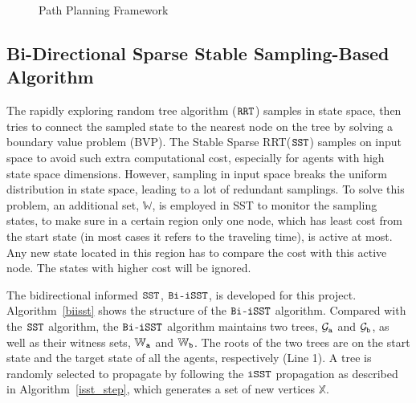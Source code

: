 \documentclass[conference, onecolumn]{IEEEtran}
\begin{document}
\begin{figure}[h]
	\centering
	\captionsetup{justification=centering}
	\caption{Path Planning Framework}
	\label{fig:framework}
\end{figure}
\subsection{Bi-Directional Sparse Stable Sampling-Based Algorithm}
The rapidly exploring random tree algorithm ($\tt RRT$)\cite{lavalle1998rapidly} samples in state space, then tries to connect the sampled state to the nearest node on the tree by solving a boundary value problem (BVP). The Stable Sparse RRT($\tt SST$)\cite{sst} samples on input space to avoid such extra computational cost, especially for agents with high state space dimensions. However, sampling in input space breaks the uniform distribution in state space, leading to a lot of redundant samplings. To solve this problem, an additional set, $\mathbb{W}$, is employed in SST to monitor the sampling states, to make sure in a certain region only one node, which has least cost from the start state (in most cases it refers to the traveling time), is active at most. Any new state located in this region has to compare the cost with this active node. The states with higher cost will be ignored. 

The bidirectional informed $\tt SST$, ${{\tt Bi}}$-${{\tt iSST}}$, is developed for this project. Algorithm~\ref{biisst} shows the structure of the ${{\tt Bi}}$-${{\tt iSST}}$ algorithm. Compared with the ${{\tt SST}}$ algorithm, the ${{\tt Bi}}$-${{\tt iSST}}$ algorithm maintains two trees, $\mathcal{G}_{\tt a} $ and $ \mathcal{G}_{\tt b} $, as well as their witness sets, $\mathbb{W}_{\tt a} $ and $ \mathbb{W}_{\tt b} $. The roots of the two trees are on the start state and the target state of all the agents, respectively (Line 1). A tree is randomly selected to propagate by following the $\tt iSST$ propagation as described in Algorithm~\ref{isst_step}, which generates a set of new vertices $\mathbb{X}$.
\end{document}
